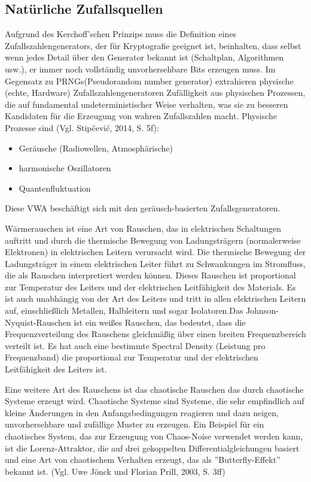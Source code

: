 \subsection{Natürliche Zufallsquellen}
Aufgrund des Kerchoff'schen Prinzips muss die Definition eines Zufallszahlengenerators, der für Kryptografie geeignet ist, beinhalten, 
dass selbst wenn jedes Detail über den Generator bekannt ist (Schaltplan, Algorithmen usw.), er immer noch vollständig unvorhersehbare 
Bits erzeugen muss. Im Gegensatz zu PRNGs(Pseudorandom number generator) extrahieren physische (echte, Hardware) Zufallszahlengeneratoren 
Zufälligkeit aus physischen Prozessen, die auf fundamental undeterministischer Weise verhalten, was sie zu besseren Kandidaten für die 
Erzeugung von wahren Zufallszahlen macht. Physische Prozesse sind (Vgl. Stipčević, 2014, S. 5f):
\begin{itemize}
    \item Geräusche (Radiowellen, Atmosphärische)
    \item harmonische Oszillatoren
    \item Quantenfluktuation
  \end{itemize}
Diese VWA beschäftigt sich mit den geräusch-basierten Zufallsgeneratoren.

Wärmerauschen ist eine Art von Rauschen, das in elektrischen Schaltungen auftritt und durch die thermische Bewegung von Ladungsträgern
(normalerweise Elektronen) in elektrischen Leitern verursacht wird. Die thermische Bewegung der Ladungsträger in einem elektrischen Leiter führt 
zu Schwankungen im Stromfluss, die als Rauschen interpretiert werden können. Dieses Rauschen ist proportional zur Temperatur des Leiters und der 
elektrischen Leitfähigkeit des Materials. Es ist auch unabhängig von der Art des Leiters und tritt in allen elektrischen Leitern auf, 
einschließlich Metallen, Halbleitern und sogar Isolatoren.Das Johnson-Nyquist-Rauschen ist ein weißes Rauschen, das bedeutet, dass die 
Frequenzverteilung des Rauschens gleichmäßig über einen breiten Frequenzbereich verteilt ist. Es hat auch eine bestimmte Spectral Density 
(Leistung pro Frequenzband) die proportional zur Temperatur und der elektrischen Leitfähigkeit des Leiters ist.

Eine weitere Art des Rauschens ist das chaotische Rauschen das durch chaotische Systeme erzeugt wird. Chaotische Systeme sind Systeme, die sehr 
empfindlich auf kleine Änderungen in den Anfangsbedingungen reagieren und dazu neigen, unvorhersehbare und zufällige Muster zu erzeugen. Ein Beispiel 
für ein chaotisches System, das zur Erzeugung von Chaos-Noise verwendet werden kann, ist die Lorenz-Attraktor, die auf drei gekoppelten 
Differentialgleichungen basiert und eine Art von chaotischem Verhalten erzeugt, das als ''Butterfly-Effekt'' bekannt ist. (Vgl. Uwe Jönck und Florian Prill, 2003, S. 3ff)

